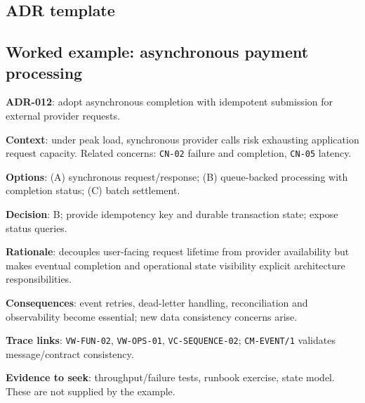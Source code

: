 \documentclass[11pt,letterpaper]{article}
\begin{document}
\subsection{ADR template}
\subsection{Worked example: asynchronous payment processing}
\begin{Worked}
\textbf{ADR-012}: adopt asynchronous completion with idempotent submission for external provider requests.\par
\textbf{Context}: under peak load, synchronous provider calls risk exhausting application request capacity. Related concerns: \texttt{CN-02} failure and completion, \texttt{CN-05} latency.\par
\textbf{Options}: (A) synchronous request/response; (B) queue-backed processing with completion status; (C) batch settlement.\par
\textbf{Decision}: B; provide idempotency key and durable transaction state; expose status queries.\par
\textbf{Rationale}: decouples user-facing request lifetime from provider availability but makes eventual completion and operational state visibility explicit architecture responsibilities.\par
\textbf{Consequences}: event retries, dead-letter handling, reconciliation and observability become essential; new data consistency concerns arise.\par
\textbf{Trace links}: \texttt{VW-FUN-02}, \texttt{VW-OPS-01}, \texttt{VC-SEQUENCE-02}; \texttt{CM-EVENT/1} validates message/contract consistency.\par
\textbf{Evidence to seek}: throughput/failure tests, runbook exercise, state model. These are not supplied by the example.
\end{Worked}
\end{document}
